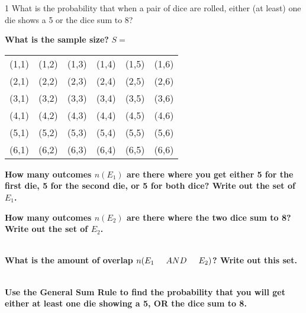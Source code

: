 \documentclass[a4paper,12pt]{book}
\newcounter{question}
\begin{document}
        \begin{question}{\thequestion}{1}
            What is the probability that when a pair of dice are rolled,
            either (at least) one die shows a 5 or the dice sum to 8?

            \textbf{What is the sample size?} \tab $S = $ 

            \begin{center}
            	\begin{tabular}{c c c c c c}
            		(1,1) & (1,2) & (1,3) & (1,4) & (1,5) & (1,6) \\
						(2,1) & (2,2) & (2,3) & (2,4) & (2,5) & (2,6) \\
            		(3,1) & (3,2) & (3,3) & (3,4) & (3,5) & (3,6) \\
						(4,1) & (4,2) & (4,3) & (4,4) & (4,5) & (4,6) \\
            		(5,1) & (5,2) & (5,3) & (5,4) & (5,5) & (5,6) \\
						(6,1) & (6,2) & (6,3) & (6,4) & (6,5) & (6,6)
            	\end{tabular}
            \end{center}


            \textbf{How many outcomes $n(E_1)$ are there where you get either 5 for the first die, 5 for the second die, or 5 for both dice? Write out the set of $E_1$.}
            ~\\

				\textbf{How many outcomes $n(E_2)$ are there where the two dice sum to 8? Write out the set of $E_2$.} ~\\
				{~\\}

				\textbf{What is the amount of overlap $n(E_1 \tab[0.5cm]AND\tab[0.5cm] E_2)$? Write out this set.} ~\\

				\textbf{Use the General Sum Rule to find the probability that you will get either
					at least one die showing a 5, OR the dice sum to 8.}

        \end{question}
\end{document}
